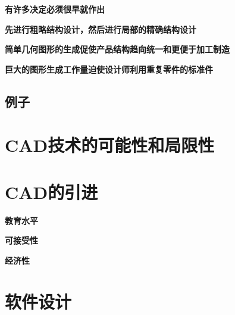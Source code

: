 \documentclass[letterpaper,10pt,english]{sphinxmanual}
\begin{document}
\textbf{有许多决定必须很早就作出}

\textbf{先进行粗略结构设计，然后进行局部的精确结构设计}

\textbf{简单几何图形的生成促使产品结构趋向统一和更便于加工制造}

\textbf{巨大的图形生成工作量迫使设计师利用重复零件的标准件}


\subsection{例子}
\label{unit10:id13}

\section{CAD技术的可能性和局限性}
\label{unit10:id14}

\section{CAD的引进}
\label{unit10:id15}
\textbf{教育水平}

\textbf{可接受性}

\textbf{经济性}


\section{软件设计}
\label{unit10:id16}
\end{document}
